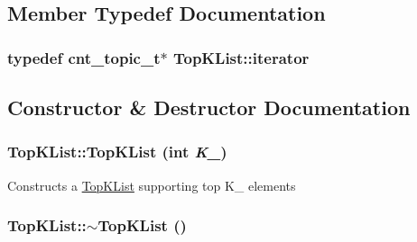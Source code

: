 \subsection{Member Typedef Documentation}
\hypertarget{class_top_k_list_ab5af055ff82cd242e13445917a847b43}{
\subsubsection[{iterator}]{\setlength{\rightskip}{0pt plus 5cm}typedef cnt\_\-topic\_\-t$\ast$ {\bf TopKList::iterator}}}
\label{class_top_k_list_ab5af055ff82cd242e13445917a847b43}


\subsection{Constructor \& Destructor Documentation}
\hypertarget{class_top_k_list_a0a0f42241693e2905d1e88612756e915}{
\subsubsection[{TopKList}]{\setlength{\rightskip}{0pt plus 5cm}TopKList::TopKList (int {\em K\_\-})}}
\label{class_top_k_list_a0a0f42241693e2905d1e88612756e915}
Constructs a \hyperlink{class_top_k_list}{TopKList} supporting top K\_\- elements \hypertarget{class_top_k_list_a38ffabab2bb7a66817462e2446099faf}{
\subsubsection[{$\sim$TopKList}]{\setlength{\rightskip}{0pt plus 5cm}TopKList::$\sim$TopKList ()}}
\label{class_top_k_list_a38ffabab2bb7a66817462e2446099faf}


